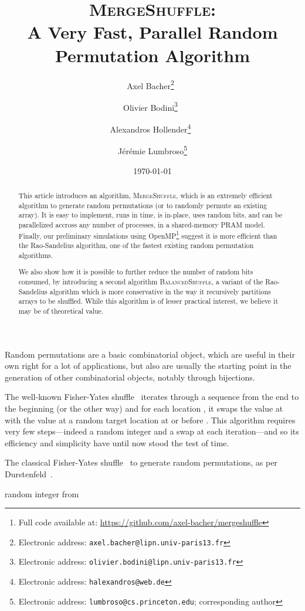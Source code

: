 \documentclass[letter,11pt,en]{quick-document}
\title{\textsc{MergeShuffle}:\\A Very Fast, Parallel Random Permutation
    Algorithm}
\author{Axel Bacher\thanks{Electronic address: \texttt{axel.bacher@lipn.univ-paris13.fr}}~}
\author{Olivier Bodini\thanks{Electronic address: \texttt{olivier.bodini@lipn.univ-paris13.fr}}~}
\author{Alexandros Hollender\thanks{Electronic address: \texttt{halexandros@web.de}}~}
\author{J\'er\'emie Lumbroso\thanks{Electronic address: \texttt{lumbroso@cs.princeton.edu};
    corresponding author}}
\affil{}
\date{\today}
\begin{document}
\maketitle

\begin{abstract}
  This article introduces an algorithm, \textsc{MergeShuffle}, which is an
  extremely efficient algorithm to generate random permutations (or to
  randomly permute an existing array). It is easy to implement, runs in
   time, is in-place, uses
   random bits, and can be parallelized
  accross any number of processes, in a shared-memory PRAM model. Finally,
  our preliminary simulations using OpenMP\footnote{Full code available
    at: \url{https://github.com/axel-bacher/mergeshuffle}}
  suggest it is more efficient than the Rao-Sandelius algorithm, one of
  the fastest existing random permutation algorithms.

  We also show how it is possible to further reduce the number of random
  bits consumed, by introducing a second algorithm
  \textsc{BalancedShuffle}, a variant of the Rao-Sandelius algorithm which
  is more conservative in the way it recursively partitions arrays to be
  shuffled. While this algorithm is of lesser practical interest, we
  believe it may be of theoretical value.
\end{abstract}


Random permutations are a basic combinatorial object, which are useful in
their own right for a lot of applications, but also are usually the
starting point in the generation of other combinatorial objects, notably
through bijections.

The well-known Fisher-Yates shuffle~\cite{FiYa48,
  Durstenfeld64} iterates through a sequence from the end to the beginning
(or the other way) and for each location , it swaps the value at 
with the value at a random target location  at or before . This
algorithm requires very few steps---indeed a random integer and a swap at
each iteration---and so its efficiency and simplicity have until now stood
the test of time.

\begin{algorithm}
  \caption{The classical Fisher-Yates shuffle~\cite{FiYa48} to generate
    random permutations, as per
    Durstenfeld~\cite{Durstenfeld64}.\label{alg-fy-shuffle}}
\begin{algorithmic}[1]
\For{}{}{}
  \State  random integer from 
  \State {}
\EndFor
\EndProcedure
\end{algorithmic}
\end{algorithm}
\end{document}
